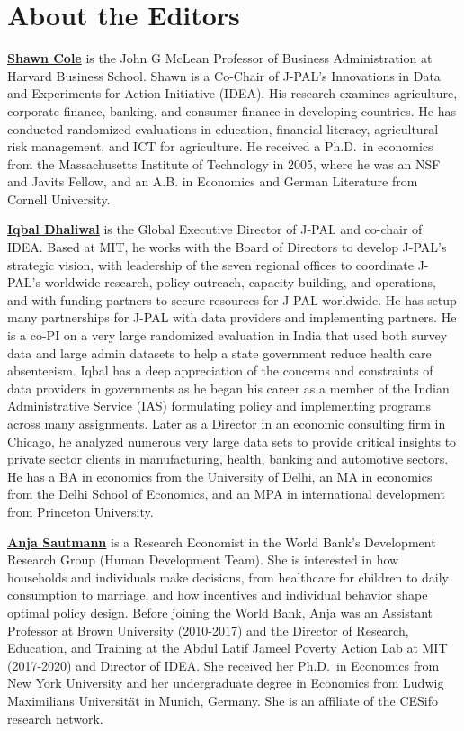 \newpage\hypertarget{about}{%
\section*{About the Editors}\label{about}}

\textbf{\href{https://www.hbs.edu/faculty/Pages/profile.aspx?facId=340064}{Shawn Cole}} is the John G McLean Professor of Business Administration at Harvard Business School. Shawn is a Co-Chair of J-PAL's Innovations in Data and Experiments for Action Initiative (IDEA). His research examines agriculture, corporate finance, banking, and consumer finance in developing countries. He has conducted randomized evaluations in education, financial literacy, agricultural risk management, and ICT for agriculture. He received a Ph.D.~in economics from the Massachusetts Institute of Technology in 2005, where he was an NSF and Javits Fellow, and an A.B. in Economics and German Literature from Cornell University.

\textbf{\href{https://www.povertyactionlab.org/person/dhaliwal}{Iqbal Dhaliwal}} is the Global Executive Director of J-PAL and co-chair of IDEA. Based at MIT, he works with the Board of Directors to develop J-PAL's strategic vision, with leadership of the seven regional offices to coordinate J-PAL's worldwide research, policy outreach, capacity building, and operations, and with funding partners to secure resources for J-PAL worldwide. He has setup many partnerships for J-PAL with data providers and implementing partners. He is a co-PI on a very large randomized evaluation in India that used both survey data and large admin datasets to help a state government reduce health care absenteeism. Iqbal has a deep appreciation of the concerns and constraints of data providers in governments as he began his career as a member of the Indian Administrative Service (IAS) formulating policy and implementing programs across many assignments. Later as a Director in an economic consulting firm in Chicago, he analyzed numerous very large data sets to provide critical insights to private sector clients in manufacturing, health, banking and automotive sectors. He has a BA in economics from the University of Delhi, an MA in economics from the Delhi School of Economics, and an MPA in international development from Princeton University.

\textbf{\href{https://www.worldbank.org/en/about/people/a/anja-sautmann}{Anja Sautmann}} is a Research Economist in the World Bank's Development Research Group (Human Development Team). She is interested in how households and individuals make decisions, from healthcare for children to daily consumption to marriage, and how incentives and individual behavior shape optimal policy design. Before joining the World Bank, Anja was an Assistant Professor at Brown University (2010-2017) and the Director of Research, Education, and Training at the Abdul Latif Jameel Poverty Action Lab at MIT (2017-2020) and Director of IDEA. She received her Ph.D.~in Economics from New York University and her undergraduate degree in Economics from Ludwig Maximilians Universität in Munich, Germany. She is an affiliate of the CESifo research network.

